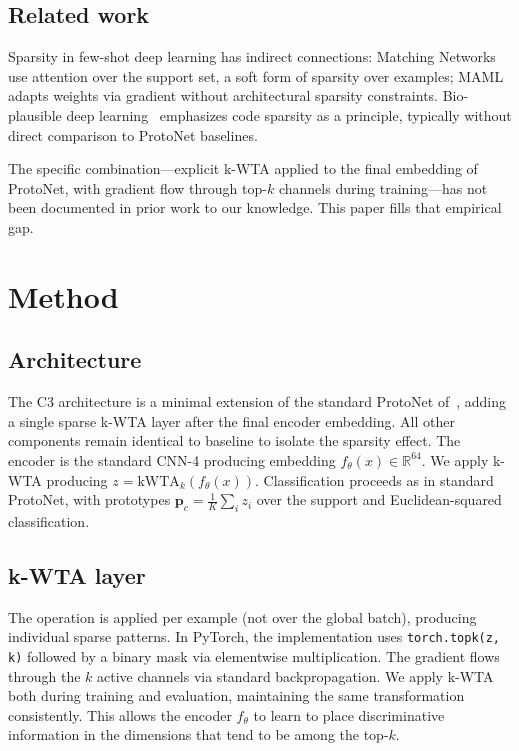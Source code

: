 \documentclass[11pt]{article}
\begin{document}
\subsection{Related work}

Sparsity in few-shot deep learning has indirect connections: Matching Networks~\citep{vinyals2016matching} use attention over the support set, a soft form of sparsity over examples; MAML~\citep{finn2017model} adapts weights via gradient without architectural sparsity constraints. Bio-plausible deep learning~\citep{ahmad2019dense} emphasizes code sparsity as a principle, typically without direct comparison to ProtoNet baselines.

The specific combination---explicit k-WTA applied to the final embedding of ProtoNet, with gradient flow through top-$k$ channels during training---has not been documented in prior work to our knowledge. This paper fills that empirical gap.

\section{Method}
\label{sec:method}

\subsection{Architecture}

The C3 architecture is a minimal extension of the standard ProtoNet of~\citet{snell2017prototypical}, adding a single sparse k-WTA layer after the final encoder embedding. All other components remain identical to baseline to isolate the sparsity effect. The encoder is the standard CNN-4 producing embedding $f_\theta(x) \in \mathbb{R}^{64}$. We apply k-WTA producing $z = \text{kWTA}_k(f_\theta(x))$. Classification proceeds as in standard ProtoNet, with prototypes $\mathbf{p}_c = \frac{1}{K} \sum_i z_i$ over the support and Euclidean-squared classification.

\subsection{k-WTA layer}

The operation is applied per example (not over the global batch), producing individual sparse patterns. In PyTorch, the implementation uses \texttt{torch.topk(z, k)} followed by a binary mask via elementwise multiplication. The gradient flows through the $k$ active channels via standard backpropagation. We apply k-WTA both during training and evaluation, maintaining the same transformation consistently. This allows the encoder $f_\theta$ to learn to place discriminative information in the dimensions that tend to be among the top-$k$.
\end{document}
